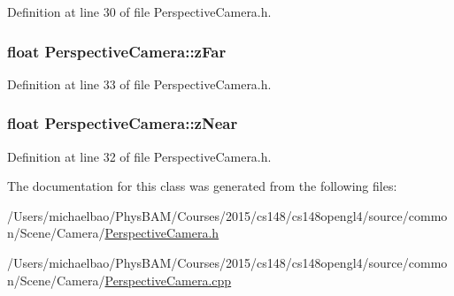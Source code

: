 Definition at line 30 of file Perspective\+Camera.\+h.

\hypertarget{class_perspective_camera_af88e6161cd3c818d49e6421f52474a2b}{}
\subsubsection[{z\+Far}]{\setlength{\rightskip}{0pt plus 5cm}float Perspective\+Camera\+::z\+Far\hspace{0.3cm}{\ttfamily [private]}}\label{class_perspective_camera_af88e6161cd3c818d49e6421f52474a2b}


Definition at line 33 of file Perspective\+Camera.\+h.

\hypertarget{class_perspective_camera_a11c1dcd1bdeb4bf8294d6272fb4d2695}{}
\subsubsection[{z\+Near}]{\setlength{\rightskip}{0pt plus 5cm}float Perspective\+Camera\+::z\+Near\hspace{0.3cm}{\ttfamily [private]}}\label{class_perspective_camera_a11c1dcd1bdeb4bf8294d6272fb4d2695}


Definition at line 32 of file Perspective\+Camera.\+h.



The documentation for this class was generated from the following files\+:\begin{DoxyCompactItemize}
\item 
/\+Users/michaelbao/\+Phys\+B\+A\+M/\+Courses/2015/cs148/cs148opengl4/source/common/\+Scene/\+Camera/\hyperlink{_perspective_camera_8h}{Perspective\+Camera.\+h}\item 
/\+Users/michaelbao/\+Phys\+B\+A\+M/\+Courses/2015/cs148/cs148opengl4/source/common/\+Scene/\+Camera/\hyperlink{_perspective_camera_8cpp}{Perspective\+Camera.\+cpp}\end{DoxyCompactItemize}
